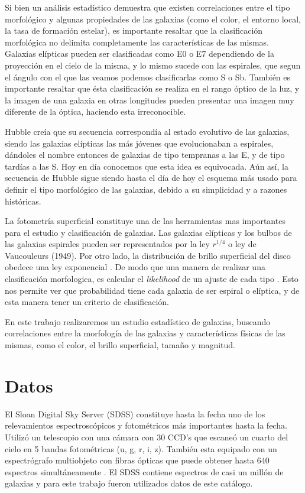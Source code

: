 \documentclass[a4paper,10pt]{article}
\begin{document}
Si bien un análisis estadístico demuestra que existen correlaciones entre el tipo morfológico y algunas propiedades de las galaxias (como el color, el entorno local, la tasa de formación estelar), es importante resaltar que la clasificaci\'on morfol\'ogica no delimita completamente las caracter\'isticas de las mismas. Galaxias elípticas pueden ser clasificadas como E0 o E7 dependiendo de la proyección en el cielo de la misma, y lo mismo sucede con las espirales, que segun el \'angulo con el que las veamos podemos clasificarlas como S o Sb. 
También es importante resaltar que \'esta clasificaci\'on se realiza en el rango óptico de la luz, y la imagen de una galaxia en otras longitudes pueden presentar una imagen muy diferente de la óptica, haciendo esta irreconocible.

Hubble cre\'ia que su secuencia correspondía al estado evolutivo de las galaxias, siendo las galaxias elípticas las m\'as j\'ovenes que evolucionaban a espirales, d\'andoles el nombre entonces de galaxias de tipo tempranas a las E, y de tipo tardías a las S. Hoy en día conocemos que esta idea es equivocada.
A\'un as\'i, la secuencia de Hubble sigue siendo hasta el día de hoy el esquema m\'as usado para definir el tipo morfológico de las galaxias, debido a su simplicidad y a razones históricas. 


La fotometría superficial constituye una de las herramientas mas importantes para el estudio y clasificación de galaxias. Las galaxias el\'ipticas y los bulbos de las galaxias espirales pueden ser representados por la ley  $r^{1/4}$ o ley de Vaucouleurs (1949). Por otro lado, la distribuci\'on de brillo superficial del disco obedece una ley exponencial \citep{Freeman1970}.
De modo que una manera de realizar una clasificación morfologica, es calcular el \textit{likelihood} de un ajuste de cada tipo \citep{Strateva2001}. Esto nos permite ver que probabilidad tiene cada galaxia de ser espiral o el\'iptica, y de esta manera tener un criterio de clasificación. 
 
En este trabajo realizaremos un estudio estad\'istico de galaxias, buscando correlaciones entre la morfolog\'ia de las galaxias y caracter\'isticas f\'isicas de las mismas, como el color, el brillo superficial, tama\~no y magnitud. 





\section{Datos}
El Sloan Digital Sky Server (SDSS) \citep{SDSS} constituye hasta la fecha uno de los relevamientos espectrosc\'opicos y fotom\'etricos m\'as importantes hasta la fecha.  Utiliz\'o un telescopio con una c\'amara con 30 CCD's que escane\'o un cuarto del cielo en 5 bandas fotom\'etricas (u, g, r, i, z). Tambi\'en esta equipado con un espectr\'ografo multiobjeto con fibras \'opticas que puede obtener hasta 640 espectros simult\'aneamente \citep{SDSS}. 
El SDSS contiene espectros de casi un mill\'on de galaxias y para este trabajo fueron utilizados datos de este cat\'alogo.
\end{document}
